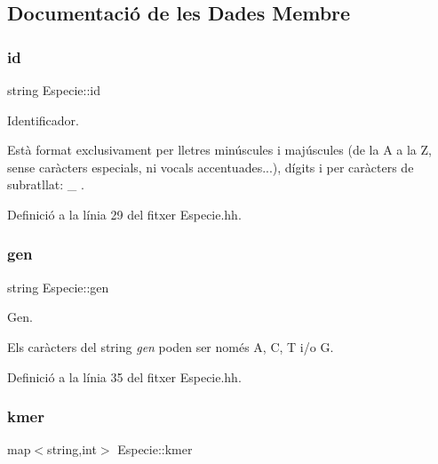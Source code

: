 \subsection{Documentació de les Dades Membre}
\mbox{\label{class_especie_a91b94109fb8a456bba7199cdda36d588}} 
\subsubsection{\texorpdfstring{id}{id}}
{\footnotesize\ttfamily string Especie\+::id\hspace{0.3cm}{\ttfamily [private]}}



Identificador. 

Està format exclusivament per lletres minúscules i majúscules (de la A a la Z, sense caràcters especials, ni vocals accentuades...), dígits i per caràcters de subratllat\+: \textquotesingle{}\+\_\+\textquotesingle{} . 

Definició a la línia 29 del fitxer Especie.\+hh.

\mbox{\label{class_especie_ac35bb565f7346cd6317b3a8c849456d1}} 
\subsubsection{\texorpdfstring{gen}{gen}}
{\footnotesize\ttfamily string Especie\+::gen\hspace{0.3cm}{\ttfamily [private]}}



Gen. 

Els caràcters del string {\itshape gen} poden ser només \textquotesingle{}A\textquotesingle{}, \textquotesingle{}C\textquotesingle{}, \textquotesingle{}T\textquotesingle{} i/o \textquotesingle{}G\textquotesingle{}. 

Definició a la línia 35 del fitxer Especie.\+hh.

\mbox{\label{class_especie_ab6740db160f2d7335a98fa8d9f745cbe}} 
\subsubsection{\texorpdfstring{kmer}{kmer}}
{\footnotesize\ttfamily map$<$string,int$>$ Especie\+::kmer\hspace{0.3cm}{\ttfamily [private]}}



